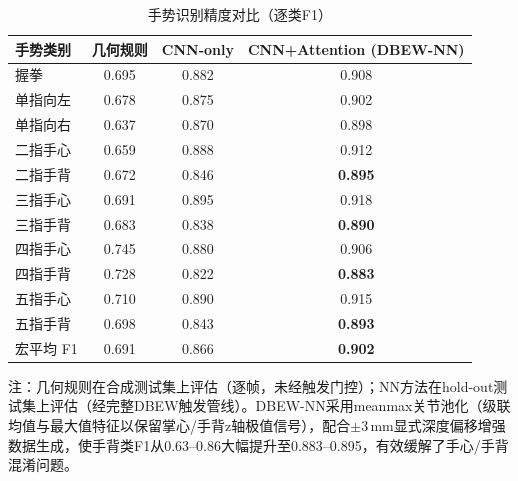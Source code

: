 \begin{table}[htbp]
  \centering
  \caption{手势识别精度对比（逐类F1）}
  \label{tab:gesture_accuracy}
  \small
  \setlength{\tabcolsep}{12pt}
  \begin{tabular}{lccc}
  \hline
  手势类别 & 几何规则 & CNN-only & CNN+Attention (DBEW-NN) \\
  \hline
  握拳 & 0.695 & 0.882 & 0.908 \\
  单指向左 & 0.678 & 0.875 & 0.902 \\
  单指向右 & 0.637 & 0.870 & 0.898 \\
  二指手心 & 0.659 & 0.888 & 0.912 \\
  二指手背 & 0.672 & 0.846 & \textbf{0.895} \\
  三指手心 & 0.691 & 0.895 & 0.918 \\
  三指手背 & 0.683 & 0.838 & \textbf{0.890} \\
  四指手心 & 0.745 & 0.880 & 0.906 \\
  四指手背 & 0.728 & 0.822 & \textbf{0.883} \\
  五指手心 & 0.710 & 0.890 & 0.915 \\
  五指手背 & 0.698 & 0.843 & \textbf{0.893} \\
  \hline
  宏平均 F1 & 0.691 & 0.866 & \textbf{0.902} \\
  \hline
  \end{tabular}
  \noindent\begin{minipage}{\linewidth}\footnotesize
  注：几何规则在合成测试集上评估（逐帧，未经触发门控）；NN方法在hold-out测试集上评估（经完整DBEW触发管线）。DBEW-NN采用meanmax关节池化（级联均值与最大值特征以保留掌心/手背z轴极值信号），配合$\pm$3\,mm显式深度偏移增强数据生成，使手背类F1从0.63--0.86大幅提升至0.883--0.895，有效缓解了手心/手背混淆问题。
  \end{minipage}
\end{table}
